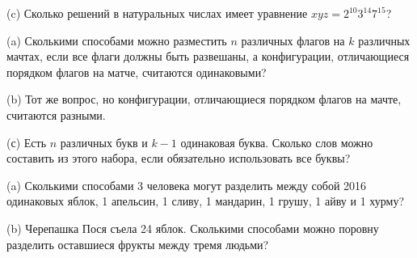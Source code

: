 \begin{problems}
(c) Сколько решений в натуральных числах имеет уравнение $xyz=2^{10}3^{14}7^{15}$?

\item 
(a) Сколькими способами можно разместить $n$ различных флагов на $k$ различных мачтах, если все флаги должны быть развешаны, а конфигурации, отличающиеся порядком флагов на матче, считаются одинаковыми?

(b) Тот же вопрос, но конфигурации, отличающиеся порядком флагов на мачте, считаются разными.

(с) Есть $n$ различных букв и $k-1$ одинаковая буква. Сколько слов можно составить из этого набора, если обязательно использовать все буквы?

\item (a) Сколькими способами 3 человека могут разделить между собой 2016 одинаковых яблок, 1 апельсин, 1 сливу, 1 мандарин, 1 грушу, 1 айву и 1 хурму?

(b) Черепашка Пося съела 24 яблок. Сколькими способами можно поровну разделить оставшиеся фрукты между тремя людьми?



\end{problems}
\renewcommand{\baselinestretch}{1}
\parskip
